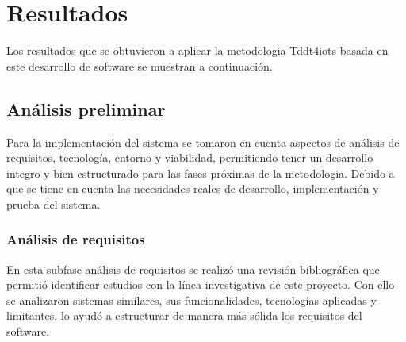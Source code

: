 \documentclass[lettersize,journal]{IEEEtran}
\begin{document}
    

\section{Resultados}

\noindent Los resultados que se obtuvieron a aplicar la metodologia Tddt4iots basada en este desarrollo de software se muestran a continuación.

\subsection {Análisis preliminar}

\noindent Para la implementación del sistema se tomaron en cuenta aspectos de análisis de requisitos, tecnología, entorno y viabilidad, permitiendo tener un desarrollo integro y bien estructurado para las fases próximas de la metodologia. Debido a que se tiene en cuenta las necesidades reales de desarrollo, implementación y prueba del sistema.

\subsubsection {Análisis de requisitos}

\noindent En esta subfase análisis de requisitos se realizó una revisión bibliográfica que permitió identificar estudios con la línea investigativa de este proyecto. Con ello se analizaron sistemas similares, sus funcionalidades, tecnologías aplicadas y limitantes, lo ayudó a estructurar de manera más sólida los requisitos del software.
\end{document}
